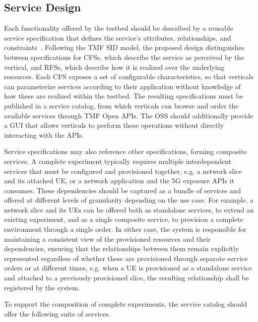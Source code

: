 \subsection{Service Design}
\label{chap:proposal:delivery:design}

Each functionality offered by the testbed should be described by a reusable service specification that defines the service's attributes, relationships, and constraints~\cite{SIDTMF, SID-MODELS-v250-TMF}. Following the \acs{TMF} \acs{SID} model, the proposed design distinguishes between specifications for \acsp{CFS}, which describe the service as perceived by the vertical, and \acsp{RFS}, which describe how it is realized over the underlying resources. Each \acs{CFS} exposes a set of configurable characteristics, so that verticals can parameterize services according to their application without knowledge of how these are realized within the testbed. The resulting specifications must be published in a service catalog, from which verticals can browse and order the available services through \acs{TMF} Open \acsp{API}. The \acs{OSS} should additionally provide a \acs{GUI} that allows verticals to perform these operations without directly interacting with the \acsp{API}.

Service specifications may also reference other specifications, forming composite services. A complete experiment typically requires multiple interdependent services that must be configured and provisioned together, e.g. a network slice and its attached \acs{UE}, or a network application and the \acs{5G} exposure \acsp{API} it consumes. These dependencies should be captured as a bundle of services and offered at different levels of granularity depending on the use case. For example, a network slice and its \acsp{UE} can be offered both as standalone services, to extend an existing experiment, and as a single composite service, to provision a complete environment through a single order. In either case, the system is responsible for maintaining a consistent view of the provisioned resources and their dependencies, ensuring that the relationships between them remain explicitly represented regardless of whether these are provisioned through separate service orders or at different times, e.g. when a \acs{UE} is provisioned as a standalone service and attached to a previously provisioned slice, the resulting relationship shall be registered by the system. 

To support the composition of complete experiments, the service catalog should offer the following suite of services.


